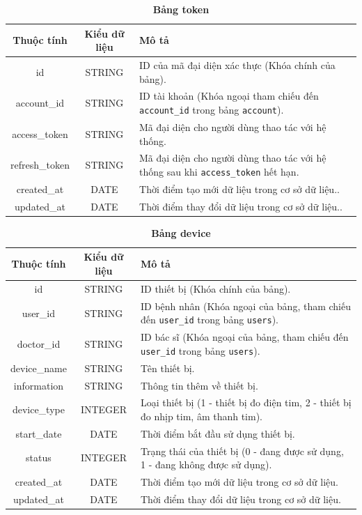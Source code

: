 \begin{table}[H]
  \caption{\bfseries \fontsize{12pt}{0pt}\selectfont Bảng token}
  \centering
  \begin{tabularx}{0.9\textwidth}{|c|c|X|}
    \hline
    \textbf{Thuộc tính} & \textbf{Kiểu dữ liệu} & \textbf{Mô tả} \\
    \hline
    id & STRING & ID của mã đại diện xác thực (Khóa chính của bảng). \\
    \hline
    account\_id & STRING & ID tài khoản (Khóa ngoại tham chiếu đến \texttt{account\_id} trong bảng \texttt{account}). \\
    \hline
    access\_token & STRING & Mã đại diện cho người dùng thao tác với hệ thống. \\
    \hline
    refresh\_token & STRING & Mã đại diện cho người dùng thao tác với hệ thống sau khi \texttt{access\_token} hết hạn. \\
    \hline
    created\_at & DATE & Thời điểm tạo mới dữ liệu trong cơ sở dữ liệu.. \\
    \hline
    updated\_at & DATE & Thời điểm thay đổi dữ liệu trong cơ sở dữ liệu.. \\
    \hline
  \end{tabularx}
\end{table}




\begin{table}[H]
  \caption{\bfseries \fontsize{12pt}{0pt}\selectfont Bảng device}
  \centering
  \begin{tabularx}{0.9\textwidth}{|c|c|X|}
    \hline
    \textbf{Thuộc tính} & \textbf{Kiểu dữ liệu} & \textbf{Mô tả} \\
    \hline
    id & STRING & ID thiết bị (Khóa chính của bảng). \\
    \hline
    user\_id & STRING & ID bệnh nhân (Khóa ngoại của bảng, tham chiếu đến \texttt{user\_id} trong bảng \texttt{users}). \\
    \hline
    doctor\_id & STRING & ID bác sĩ (Khóa ngoại của bảng, tham chiếu đến \texttt{user\_id} trong bảng \texttt{users}). \\
    \hline
    device\_name & STRING & Tên thiết bị. \\
    \hline
    information & STRING & Thông tin thêm về thiết bị. \\
    \hline
    device\_type & INTEGER & Loại thiết bị (1 - thiết bị đo điện tim, 2 - thiết bị đo nhịp tim, âm thanh tim). \\
    \hline
    start\_date & DATE & Thời điểm bắt đầu sử dụng thiết bị. \\
    \hline
    status & INTEGER & Trạng thái của thiết bị (0 - đang được sử dụng, 1 - đang không được sử dụng). \\
    \hline
    created\_at & DATE & Thời điểm tạo mới dữ liệu trong cơ sở dữ liệu. \\
    \hline
    updated\_at & DATE & Thời điểm thay đổi dữ liệu trong cơ sở dữ liệu. \\
    \hline
  \end{tabularx}
\end{table}


